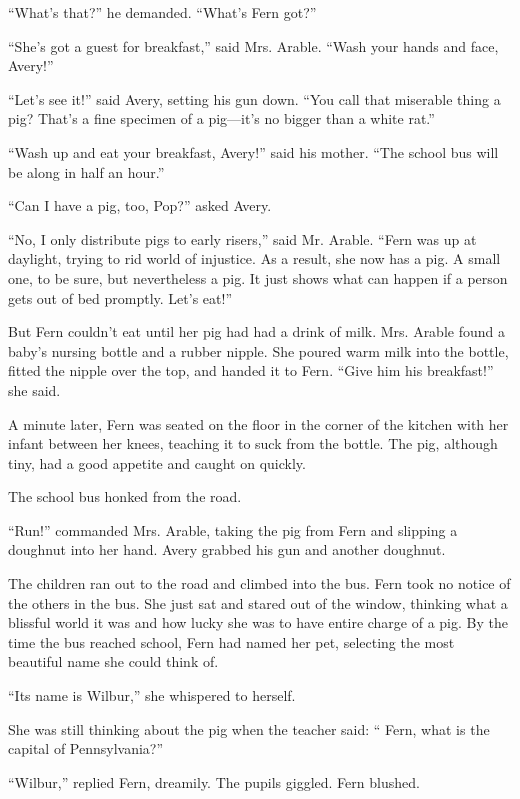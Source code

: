 \documentclass[a4paper, oneside]{book}
\begin{document}
``What's that?'' he demanded. ``What's Fern got?''

 ``She's got a guest for breakfast,'' said Mrs. Arable. ``Wash your
hands and face, Avery!''

 ``Let's see it!'' said Avery, setting his gun down. ``You call that
miserable thing a pig? That's a fine specimen of a pig---it's no bigger
than a white rat.''

 ``Wash up and eat your breakfast, Avery!'' said his mother. ``The
school bus will be along in half an hour.''

 ``Can I have a pig, too, Pop?'' asked Avery.
 
 ``No, I only distribute pigs to early risers,'' said Mr. Arable. ``Fern
was up at daylight, trying to rid world of injustice. As a result, she
now has a pig. A small one, to be sure, but nevertheless a pig. It
just shows what can happen if a person gets out of bed promptly.
Let's eat!'' 

But Fern couldn't eat until her pig had had a drink of milk. Mrs.                   
Arable found a baby's nursing bottle and a rubber nipple. She
poured warm milk into the bottle, fitted the nipple over the top,
and handed it to Fern. ``Give him his breakfast!'' she said. 

A minute later, Fern was seated on the floor in the corner of the
kitchen with her infant between her knees, teaching it to suck from
the bottle. The pig, although tiny, had a good appetite and caught
on quickly. 

The school bus honked from the road.                                   

 ``Run!'' commanded Mrs. Arable, taking the pig from Fern and
slipping a doughnut into her hand. Avery grabbed his gun and
another doughnut.

 The children ran out to the road and climbed into the bus. Fern
took no notice of the others in the bus. She just sat and stared out 
of the window, thinking what a blissful world it was and how lucky
she was to have entire charge of a pig. By the time the bus reached
school, Fern had named her pet, selecting the most beautiful name
she could think of. 

``Its name is Wilbur,'' she whispered to herself.

 She was still thinking about the pig when the teacher said: `` Fern,
what is the capital of Pennsylvania?''

 ``Wilbur,'' replied Fern, dreamily. The pupils giggled. Fern
blushed.                                                            
\end{document}

